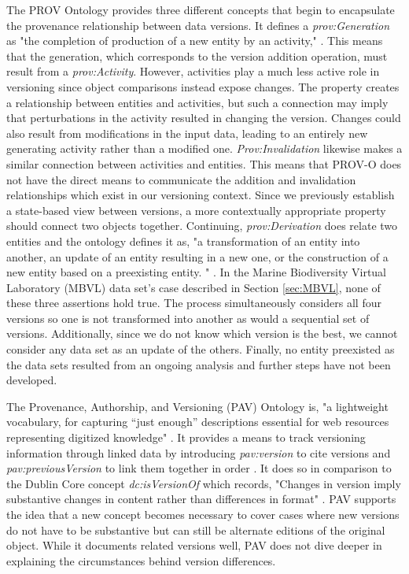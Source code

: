 The PROV Ontology provides three different concepts that begin to encapsulate the provenance relationship between data versions.
It defines a \textit{prov:Generation} as "the completion of production of a new entity by an activity," \cite{Lebo2013}.
This means that the generation, which corresponds to the version addition operation, must result from a \textit{prov:Activity}.
However, activities play a much less active role in versioning since object comparisons instead expose changes.
The property creates a relationship between entities and activities, but such a connection may imply that perturbations in the activity resulted in changing the version.
Changes could also result from modifications in the input data, leading to an entirely new generating activity rather than a modified one.
\textit{Prov:Invalidation} likewise makes a similar connection between activities and entities.
This means that PROV-O does not have the direct means to communicate the addition and invalidation relationships which exist in our versioning context.
Since we previously establish a state-based view between versions, a more contextually appropriate property should connect two objects together.
Continuing, \textit{prov:Derivation} does relate two entities and the ontology defines it as, "a transformation of an entity into another, an update of an entity resulting in a new one, or the construction of a new entity based on a preexisting entity. " \cite{Lebo2013}.
In the Marine Biodiversity Virtual Laboratory (MBVL) data set's case described in Section \ref{sec:MBVL}, none of these three assertions hold true. 
The process simultaneously considers all four versions so one is not transformed into another as would a sequential set of versions.
Additionally, since we do not know which version is the best, we cannot consider any data set as an update of the others.
Finally, no entity preexisted as the data sets resulted from an ongoing analysis and further steps have not been developed.

The Provenance, Authorship, and Versioning (PAV) Ontology is, "a lightweight vocabulary, for capturing ``just enough” descriptions essential for web resources representing digitized knowledge" \cite{Ciccarese2013}.
It provides a means to track versioning information through linked data by introducing \textit{pav:version} to cite versions and \textit{pav:previousVersion} to link them together in order \cite{Ciccarese2013}.
It does so in comparison to the Dublin Core concept \textit{dc:isVersionOf} which records, "Changes in version imply substantive changes in content rather than differences in format" \cite{DCMI2012}.
PAV supports the idea that a new concept becomes necessary to cover cases where new versions do not have to be substantive but can still be alternate editions of the original object.
While it documents related versions well, PAV does not dive deeper in explaining the circumstances behind version differences.

